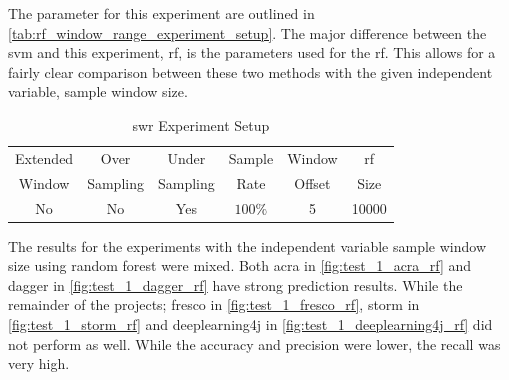
The parameter for this experiment are outlined in \autoref{tab:rf_window_range_experiment_setup}. The major difference between the \gls{svm} and this experiment, \gls{rf}, is the parameters used for the \gls{rf}. This allows for a fairly clear comparison between these two methods with the given independent variable, sample window size.

\begin{table}[h]
\begin{center}

    \begin{tabular}{|c|c|c|c|c|c|}
        \hline
        Extended & Over & Under & Sample & Window & \gls{rf} \\
        Window & Sampling & Sampling & Rate & Offset & Size \\ \hline
        No & No & Yes & $100\%$ & 5 & 10000 \\ \hline
    \end{tabular}
    \caption{\gls{swr} Experiment Setup}
    \label{tab:rf_window_range_experiment_setup}
\end{center}

\end{table}

The results for the experiments with the independent variable sample window size using random forest were mixed. Both acra in \autoref{fig:test_1_acra_rf} and dagger in \autoref{fig:test_1_dagger_rf} have strong prediction results. While the remainder of the projects; fresco in \autoref{fig:test_1_fresco_rf}, storm in \autoref{fig:test_1_storm_rf} and deeplearning4j in \autoref{fig:test_1_deeplearning4j_rf} did not perform as well. While the accuracy and precision were lower, the recall was very high.

